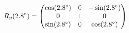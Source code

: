 \documentclass[preview]{standalone}
\begin{document}
\begin{align*}
\special{dvisvgm:raw <g id='unique000'>}R_y(2.8^\circ) = \begin{pmatrix} \cos(2.8^\circ) & 0 & -\sin(2.8^\circ) \\ 0 & 1 & 0 \\ \sin(2.8^\circ) & 0 & \cos(2.8^\circ) \end{pmatrix}\special{dvisvgm:raw </g>}
\end{align*}
\end{document}
